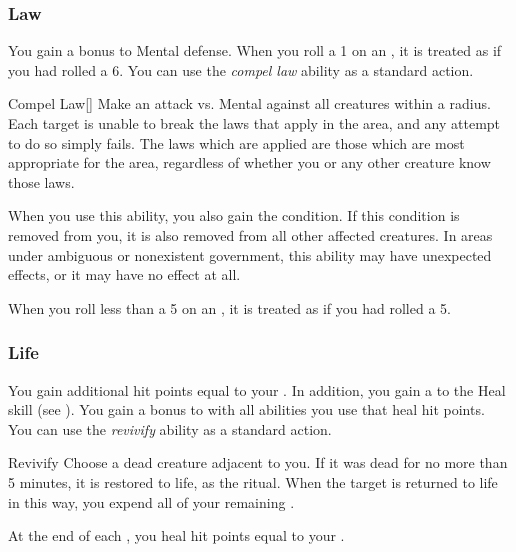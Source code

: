         \subsubsection{Law}
             You gain a  bonus to Mental defense.
             When you roll a 1 on an , it is treated as if you had rolled a 6.
             You can use the \textit{compel law} ability as a standard action.
            \begin{apability}{Compel Law}[]
                Make an attack vs. Mental against all creatures within a \arealarge radius.
                \hit Each target is unable to break the laws that apply in the area, and any attempt to do so simply fails.
                The laws which are applied are those which are most appropriate for the area, regardless of whether you or any other creature know those laws.

                When you use this ability, you also gain the condition.
                If this condition is removed from you, it is also removed from all other affected creatures.
                In areas under ambiguous or nonexistent government, this ability may have unexpected effects, or it may have no effect at all.
            \end{apability}
             When you roll less than a 5 on an , it is treated as if you had rolled a 5.

        \subsubsection{Life}
             You gain additional hit points equal to your .
            In addition, you gain a   to the Heal skill (see ).
             You gain a  bonus to  with all abilities you use that heal hit points.
             You can use the \textit{revivify} ability as a standard action.
            \begin{apability}{Revivify}
                Choose a dead creature adjacent to you.
                If it was dead for no more than 5 minutes, it is restored to life, as the  ritual.
                When the target is returned to life in this way, you expend all of your remaining .
            \end{apability}
             At the end of each , you heal hit points equal to your .

